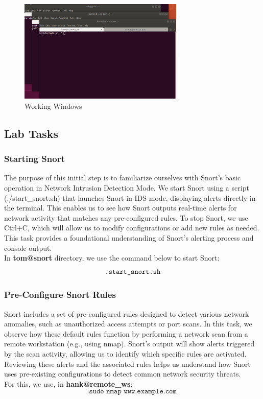 \documentclass[a4paper,11pt]{article} %
\begin{document}
\begin{figure}[h!]
    \centering
    \includegraphics[width=0.7\textwidth]{images/15.png}
    \caption{Working Windows}
\end{figure}

\subsection{Lab Tasks}
\subsubsection{Starting Snort}
The purpose of this initial step is to familiarize ourselves with Snort’s basic operation in Network Intrusion Detection Mode. We start Snort using a script (./start\_snort.sh) that launches Snort in IDS mode, displaying alerts directly in the terminal. This enables us to see how Snort outputs real-time alerts for network activity that matches any pre-configured rules. To stop Snort, we use Ctrl+C, which will allow us to modify configurations or add new rules as needed. This task provides a foundational understanding of Snort’s alerting process and console output.\\
In \textbf{tom@snort} directory, we use the command below to start Snort:
\[\texttt{.\/start\_snort.sh}\]

\subsubsection{Pre-Configure Snort Rules}
Snort includes a set of pre-configured rules designed to detect various network anomalies, such as unauthorized access attempts or port scans. In this task, we observe how these default rules function by performing a network scan from a remote workstation (e.g., using nmap). Snort’s output will show alerts triggered by the scan activity, allowing us to identify which specific rules are activated. Reviewing these alerts and the associated rules helps us understand how Snort uses pre-existing configurations to detect common network security threats.\\
For this, we use, in \textbf{hank@remote\_ws}:
\[\texttt{sudo nmap www.example.com}\]
\end{document}
